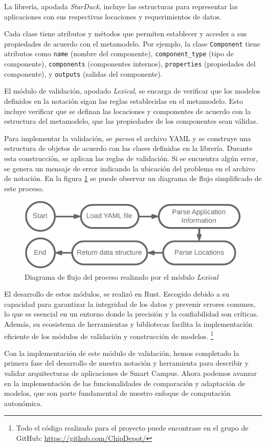 La librería, apodada \textit{StarDuck}, incluye las estructuras para representar las aplicaciones con sus respectivas locaciones y requerimientos de datos. 


Cada clase tiene atributos y métodos que permiten establecer y acceder a sus propiedades de acuerdo con el metamodelo. Por ejemplo, la clase \texttt{Component} tiene atributos como \texttt{name} (nombre del componente), \texttt{component\_type} (tipo de componente), \texttt{components} (componentes internos), \texttt{properties} (propiedades del componente), y \texttt{outputs} (salidas del componente).

El módulo de validación, apodado \textit{Lexical}, se encarga de verificar que los modelos definidos en la notación sigan las reglas establecidas en el metamodelo. Esto incluye verificar que se definan las locaciones y componentes de acuerdo con la estructura del metamodelo, que las propiedades de los componentes sean válidas.

Para implementar la validación, se \textit{parsea} el archivo YAML y se construye una estructura de objetos de acuerdo con las clases definidas en la librería. Durante esta construcción, se aplican las reglas de validación. Si se encuentra algún error, se genera un mensaje de error indicando la ubicación del problema en el archivo de notación. En la figura \ref{fig:LexicalFlow} se puede observar un diagrama de flujo simplificado de este proceso.

\begin{figure}[H]
    \centering
    \caption{Diagrama de flujo del proceso realizado por el módulo \textit{Lexical}}
    \label{fig:LexicalFlow}
    \vspace{2mm}
    \includegraphics[width=\linewidth]{images/LexicalFlow.pdf}
\end{figure}

El desarrollo de estos módulos, se realizó en Rust. Escogido debido a su capacidad para garantizar la integridad de los datos y prevenir errores comunes, lo que es esencial en un entorno donde la precisión y la confiabilidad son críticas. Además, su ecosistema de herramientas y bibliotecas facilita la implementación eficiente de los módulos de validación y construcción de modelos. \footnote{Todo el código realizado para el proyecto puede encontrase en el grupo de GitHub: \url{https://github.com/ChipDepot/}}

Con la implementación de este módulo de validación, hemos completado la primera fase del desarrollo de nuestra notación y herramienta para describir y validar arquitecturas de aplicaciones de Smart Campus. Ahora podemos avanzar en la implementación de las funcionalidades de comparación y adaptación de modelos, que son parte fundamental de nuestro enfoque de computación autonómica. 


